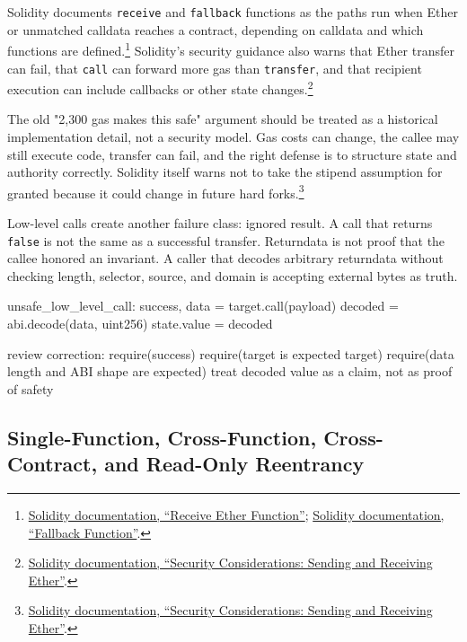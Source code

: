 Solidity documents \texttt{receive} and \texttt{fallback} functions as the paths run when Ether or unmatched calldata reaches a contract, depending on calldata and which functions are defined.\footnote{\href{https://docs.soliditylang.org/en/latest/contracts.html\#receive-ether-function}{Solidity documentation, ``Receive Ether Function''}; \href{https://docs.soliditylang.org/en/latest/contracts.html\#fallback-function}{Solidity documentation, ``Fallback Function''}.} Solidity's security guidance also warns that Ether transfer can fail, that \texttt{call} can forward more gas than \texttt{transfer}, and that recipient execution can include callbacks or other state changes.\footnote{\href{https://docs.soliditylang.org/en/latest/security-considerations.html\#sending-and-receiving-ether}{Solidity documentation, ``Security Considerations: Sending and Receiving Ether''}.}

The old "2,300 gas makes this safe" argument should be treated as a historical implementation detail, not a security model. Gas costs can change, the callee may still execute code, transfer can fail, and the right defense is to structure state and authority correctly. Solidity itself warns not to take the stipend assumption for granted because it could change in future hard forks.\footnote{\href{https://docs.soliditylang.org/en/latest/security-considerations.html\#sending-and-receiving-ether}{Solidity documentation, ``Security Considerations: Sending and Receiving Ether''}.}

Low-level calls create another failure class: ignored result. A call that returns \texttt{false} is not the same as a successful transfer. Returndata is not proof that the callee honored an invariant. A caller that decodes arbitrary returndata without checking length, selector, source, and domain is accepting external bytes as truth.

\begin{codeblock}
unsafe_low_level_call:
    success, data = target.call(payload)
    decoded = abi.decode(data, uint256)
    state.value = decoded

review correction:
    require(success)
    require(target is expected target)
    require(data length and ABI shape are expected)
    treat decoded value as a claim, not as proof of safety
\end{codeblock}

\subsection{Single-Function, Cross-Function, Cross-Contract, and Read-Only Reentrancy}

